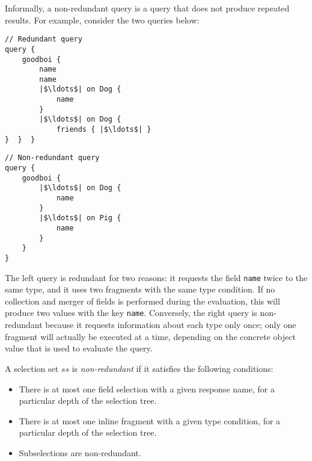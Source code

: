 Informally, 
a non-redundant query is a query that does not produce repeated results.
For example, consider the two queries below:

\begin{minipage}[t]{.25\textwidth}
\begin{verbatim}
// Redundant query
query {
    goodboi {
        name
        name
        |$\ldots$| on Dog {
            name
        }
        |$\ldots$| on Dog {
            friends { |$\ldots$| }
}  }  }
\end{verbatim}
\end{minipage}%
\begin{minipage}[t]{.25\textwidth}
\begin{verbatim}
// Non-redundant query
query {
    goodboi {
        |$\ldots$| on Dog {
            name
        }
        |$\ldots$| on Pig {
            name
        }
    } 
}
\end{verbatim} 
\end{minipage}

The left query is redundant for two reasons: it requests the field \texttt{name} twice to the same type, and it uses two fragments with the same type condition. If no collection and merger of fields is performed during the evaluation, this will produce two values with the key \texttt{name}. 
Conversely, the right query is non-redundant because it requests information about each type only once; only one fragment will actually be executed at a time, depending on the concrete object value that is used to evaluate the query.

\begin{definition}
A \gql selection set $ss$ is \textit{non-redundant} if it satisfies the following conditions:
\begin{itemize}
    \item There is at most one field selection with a given response name, for a particular depth of the selection tree.

    \item There is at most one inline fragment with a given type condition, for a particular depth of the selection tree.
    
    \item Subselections are non-redundant.
\end{itemize}
\end{definition}

